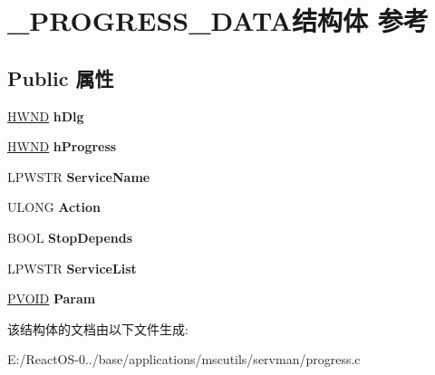 \hypertarget{struct___p_r_o_g_r_e_s_s___d_a_t_a}{}\section{\+\_\+\+P\+R\+O\+G\+R\+E\+S\+S\+\_\+\+D\+A\+T\+A结构体 参考}
\label{struct___p_r_o_g_r_e_s_s___d_a_t_a}
\subsection*{Public 属性}
\begin{DoxyCompactItemize}
\item 
\mbox{\label{struct___p_r_o_g_r_e_s_s___d_a_t_a_a261d5e2cb22b8f1c620d7ba9fac2bb72}} 
\hyperlink{interfacevoid}{H\+W\+ND} {\bfseries h\+Dlg}
\item 
\mbox{\label{struct___p_r_o_g_r_e_s_s___d_a_t_a_a70fa68a0c12d5e9d941675b58b728d14}} 
\hyperlink{interfacevoid}{H\+W\+ND} {\bfseries h\+Progress}
\item 
\mbox{\label{struct___p_r_o_g_r_e_s_s___d_a_t_a_af677c74de58e43645616f4069c2fa15f}} 
L\+P\+W\+S\+TR {\bfseries Service\+Name}
\item 
\mbox{\label{struct___p_r_o_g_r_e_s_s___d_a_t_a_adbe739122746d7a8f1aff6337a619359}} 
U\+L\+O\+NG {\bfseries Action}
\item 
\mbox{\label{struct___p_r_o_g_r_e_s_s___d_a_t_a_a6a32c43d2d4ad1276f8cb6b02d3365c7}} 
B\+O\+OL {\bfseries Stop\+Depends}
\item 
\mbox{\label{struct___p_r_o_g_r_e_s_s___d_a_t_a_a3022b7408bbe31f0e6edbe880aeff1e5}} 
L\+P\+W\+S\+TR {\bfseries Service\+List}
\item 
\mbox{\label{struct___p_r_o_g_r_e_s_s___d_a_t_a_af5d7cebbf62bbc6f0d9c203aba90fee4}} 
\hyperlink{interfacevoid}{P\+V\+O\+ID} {\bfseries Param}
\end{DoxyCompactItemize}


该结构体的文档由以下文件生成\+:\begin{DoxyCompactItemize}
\item 
E\+:/\+React\+O\+S-\/0../base/applications/mscutils/servman/progress.\+c\end{DoxyCompactItemize}
